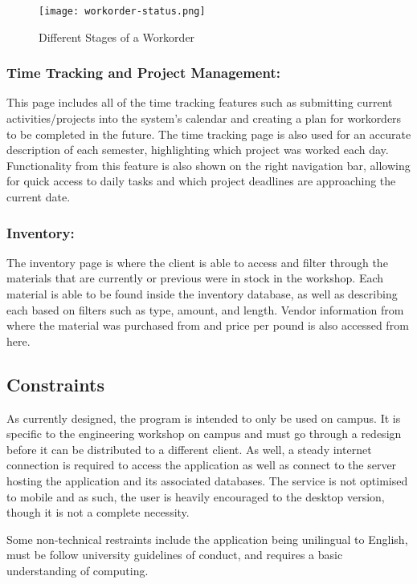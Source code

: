 {\begin{figure}[h]
	\centering
	\texttt{[image: workorder-status.png]}\\
	\caption{Different Stages of a Workorder}
	\label{fig:tobias}
\end{figure}

\subsubsection*{Time Tracking and Project Management:}
This page includes all of the time tracking features such as submitting current activities/projects into the system's calendar and creating a plan for workorders to be completed in the future. The time tracking page is also used for an accurate description of each semester, highlighting which project was worked each day. Functionality from this feature is also shown on the right navigation bar, allowing for quick access to daily tasks and which project deadlines are approaching the current date.

\subsubsection*{Inventory:}
The inventory page is where the client is able to access and filter through the materials that are currently or previous were in stock in the workshop. Each material is able to be found inside the inventory database, as well as describing each based on filters such as type, amount, and length. Vendor information from where the material was purchased from and price per pound is also accessed from here. 

\subsection{Constraints}
As currently designed, the program is intended to only be used on campus. It is specific to the engineering workshop on campus and must go through a redesign before it can be distributed to a different client. As well, a steady internet connection is required to access the application as well as connect to the server hosting the application and its associated databases. The service is not optimised to mobile and as such, the user is heavily encouraged to the desktop version, though it is not a complete necessity.  
\newline
{\setlength{\parindent}{0cm}

Some non-technical restraints include the application being unilingual to English, must be follow university guidelines of conduct, and requires a basic understanding of computing.  

}}
